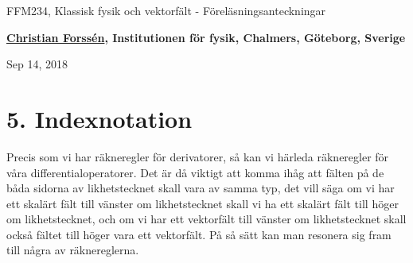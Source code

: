 \documentclass[%
oneside,                 %
final,                   %
10pt]{article}
\begin{document}

\newcommand{\exercisesection}[1]{\subsection*{#1}}







\thispagestyle{empty}

\begin{center}
{\LARGE\bf
\begin{spacing}{1.25}
FFM234, Klassisk fysik och vektorfält - Föreläsningsanteckningar
\end{spacing}
}
\end{center}


\begin{center}
{\bf \href{{http://fy.chalmers.se/subatom/tsp/}}{Christian Forssén}, Institutionen för fysik, Chalmers, Göteborg, Sverige${}^{}$} \\ [0mm]
\end{center}

\begin{center}
\end{center}
    

\begin{center}
Sep 14, 2018
\end{center}

\vspace{1cm}


\section*{5. Indexnotation}

Precis som vi har räkneregler för derivatorer, så kan vi härleda räkneregler för våra differentialoperatorer. Det är då viktigt att komma ihåg att fälten på de båda sidorna av likhetstecknet skall vara av samma typ, det vill säga om vi har ett skalärt fält till vänster om likhetstecknet skall vi ha ett skalärt fält till höger om likhetstecknet, och om vi har ett vektorfält till vänster om likhetstecknet skall också fältet till höger vara ett vektorfält.  På så sätt kan man resonera sig fram till några av räknereglerna.
\end{document}
